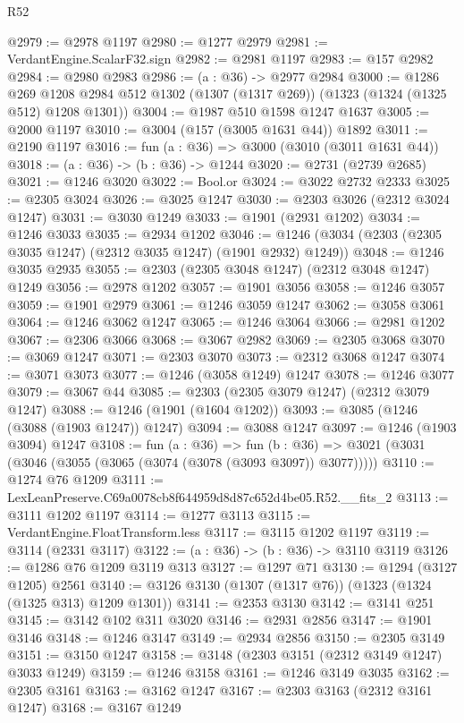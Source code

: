\begin{lexlean}{R52}
\begin{coremodule}
@2979 := @2978 @1197
@2980 := @1277 @2979
@2981 := VerdantEngine.ScalarF32.sign
@2982 := @2981 @1197
@2983 := @157 @2982
@2984 := @2980 @2983
@2986 := (a : @36) -> @2977 @2984
@3000 := @1286
    @269
    @1208
    @2984
    @512
    @1302
    (@1307 (@1317 @269))
    (@1323 (@1324 (@1325 @512) @1208 @1301))
@3004 := @1987 @510 @1598 @1247 @1637
@3005 := @2000 @1197
@3010 := @3004 (@157 (@3005 @1631 @44)) @1892
@3011 := @2190 @1197
@3016 := fun (a : @36) => @3000 (@3010 (@3011 @1631 @44))
@3018 := (a : @36) -> (b : @36) -> @1244
@3020 := @2731 (@2739 @2685)
@3021 := @1246 @3020
@3022 := Bool.or
@3024 := @3022 @2732 @2333
@3025 := @2305 @3024
@3026 := @3025 @1247
@3030 := @2303 @3026 (@2312 @3024 @1247)
@3031 := @3030 @1249
@3033 := @1901 (@2931 @1202)
@3034 := @1246 @3033
@3035 := @2934 @1202
@3046 := @1246 (@3034 (@2303 (@2305 @3035 @1247) (@2312 @3035 @1247) (@1901 @2932) @1249))
@3048 := @1246 @3035 @2935
@3055 := @2303 (@2305 @3048 @1247) (@2312 @3048 @1247) @1249
@3056 := @2978 @1202
@3057 := @1901 @3056
@3058 := @1246 @3057
@3059 := @1901 @2979
@3061 := @1246 @3059 @1247
@3062 := @3058 @3061
@3064 := @1246 @3062 @1247
@3065 := @1246 @3064
@3066 := @2981 @1202
@3067 := @2306 @3066
@3068 := @3067 @2982
@3069 := @2305 @3068
@3070 := @3069 @1247
@3071 := @2303 @3070
@3073 := @2312 @3068 @1247
@3074 := @3071 @3073
@3077 := @1246 (@3058 @1249) @1247
@3078 := @1246 @3077
@3079 := @3067 @44
@3085 := @2303 (@2305 @3079 @1247) (@2312 @3079 @1247)
@3088 := @1246 (@1901 (@1604 @1202))
@3093 := @3085 (@1246 (@3088 (@1903 @1247)) @1247)
@3094 := @3088 @1247
@3097 := @1246 (@1903 @3094) @1247
@3108 := fun (a : @36) =>
  fun (b : @36) => @3021 (@3031 (@3046 (@3055 (@3065 (@3074 (@3078 (@3093 @3097)) @3077)))))
@3110 := @1274 @76 @1209
@3111 := LexLeanPreserve.C69a0078cb8f644959d8d87c652d4be05.R52.__fits_2
@3113 := @3111 @1202 @1197
@3114 := @1277 @3113
@3115 := VerdantEngine.FloatTransform.less
@3117 := @3115 @1202 @1197
@3119 := @3114 (@2331 @3117)
@3122 := (a : @36) -> (b : @36) -> @3110 @3119
@3126 := @1286 @76 @1209 @3119 @313
@3127 := @1297 @71
@3130 := @1294 (@3127 @1205) @2561
@3140 := @3126 @3130 (@1307 (@1317 @76)) (@1323 (@1324 (@1325 @313) @1209 @1301))
@3141 := @2353 @3130
@3142 := @3141 @251
@3145 := @3142 @102 @311 @3020
@3146 := @2931 @2856
@3147 := @1901 @3146
@3148 := @1246 @3147
@3149 := @2934 @2856
@3150 := @2305 @3149
@3151 := @3150 @1247
@3158 := @3148 (@2303 @3151 (@2312 @3149 @1247) @3033 @1249)
@3159 := @1246 @3158
@3161 := @1246 @3149 @3035
@3162 := @2305 @3161
@3163 := @3162 @1247
@3167 := @2303 @3163 (@2312 @3161 @1247)
@3168 := @3167 @1249

\end{coremodule}
\end{lexlean}
